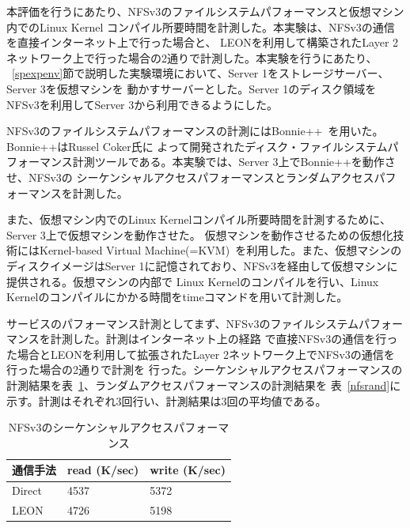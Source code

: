 本評価を行うにあたり、NFSv3のファイルシステムパフォーマンスと仮想マシン内でのLinux Kernel
コンパイル所要時間を計測した。本実験は、NFSv3の通信を直接インターネット上で行った場合と、
LEONを利用して構築されたLayer 2ネットワーク上で行った場合の2通りで計測した。本実験を行うにあたり、
~\ref{spexpenv}節で説明した実験環境において、Server 1をストレージサーバー、Server 3を仮想マシンを
動かすサーバーとした。Server 1のディスク領域をNFSv3を利用してServer 3から利用できるようにした。

NFSv3のファイルシステムパフォーマンスの計測にはBonnie++~\cite{bonnieplusplus}を用いた。Bonnie++はRussel Coker氏に
よって開発されたディスク・ファイルシステムパフォーマンス計測ツールである。本実験では、Server 3上でBonnie++を動作させ、NFSv3の
シーケンシャルアクセスパフォーマンスとランダムアクセスパフォーマンスを計測した。

また、仮想マシン内でのLinux Kernelコンパイル所要時間を計測するために、Server 3上で仮想マシンを動作させた。
仮想マシンを動作させるための仮想化技術にはKernel-based Virtual Machine(=KVM)~\cite{kvm}を利用した。また、仮想マシンの
ディスクイメージはServer 1に記憶されており、NFSv3を経由して仮想マシンに提供される。仮想マシンの内部で
Linux Kernelのコンパイルを行い、Linux Kernelのコンパイルにかかる時間をtimeコマンドを用いて計測した。

サービスのパフォーマンス計測としてまず、NFSv3のファイルシステムパフォーマンスを計測した。計測はインターネット上の経路
で直接NFSv3の通信を行った場合とLEONを利用して拡張されたLayer 2ネットワーク上でNFSv3の通信を行った場合の2通りで計測を
行った。シーケンシャルアクセスパフォーマンスの計測結果を表~\ref{nfsseq}、ランダムアクセスパフォーマンスの計測結果を
表~\ref{nfsrand}に示す。計測はそれぞれ3回行い、計測結果は3回の平均値である。

\begin{table}[h]
        \begin{center}
                \caption{NFSv3のシーケンシャルアクセスパフォーマンス}
                \begin{tabular}{|l|l|l|}
                        \hline
                                通信手法 & read (K/sec) & write (K/sec) \\
                        \hline
			\hline
                                Direct & 4537 & 5372 \\
			\hline
				LEON & 4726 & 5198 \\
                        \hline
                \end{tabular}
                \label{nfsseq}
        \end{center}
\end{table}

